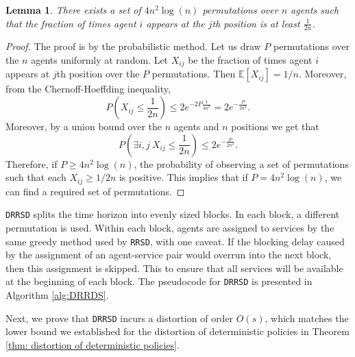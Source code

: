 \documentclass[letterpaper,11pt]{article}
\newtheorem{lemma}{Lemma}
\newcommand{\E}{\mathbb{E}}
\begin{document}
\begin{lemma}\label{lem:derandomization}
There exists a set of $4n^2 \log(n)$ permutations over $n$ agents such that the fraction of times agent $i$ appears at the $j$th position is at least $\frac{1}{2n}$.
\end{lemma}
\begin{proof}
    The proof is by the probabilistic method. Let us draw $P$ permutations over the $n$ agents uniformly at random. Let $X_{ij}$ be the fraction of times agent $i$ appears at $j$th position over the $P$ permutations. Then $\E[X_{ij}] = 1/n$. Moreover, from the Chernoff-Hoeffding inequality,
    $$
    P\left(X_{ij} \le \frac{1}{2n} \right) \le 2 e^{-2P\frac{1}{4n^2}} = 2 e^{-\frac{P}{2n^2}}.
    $$
    Moreover, by a union bound over the $n$ agents and $n$ positions we get that $$
    P\left(\exists i,j \ X_{ij} \le \frac{1}{2n} \right) \le 2 e^{-\frac{P}{2n^2}}.
    $$
    Therefore, if $P \ge 4n^2 \log(n)$, the probability of observing a set of permutations such that each $X_{ij} \ge 1/2n$ is positive. This implies that if $P = 4n^2 \log(n)$, we can find a required set of permutations.
\end{proof}
\texttt{DRRSD} splits the time horizon into evenly sized blocks. In each block, a different permutation is used. Within each block, agents are assigned to services by the same greedy method used by \texttt{RRSD}, with one caveat. If the blocking delay caused by the assignment of an agent-service pair would overrun into the next block, then this assignment is skipped. This to ensure that all services will be available at the beginning of each block. The pseudocode for \texttt{DRRSD} is presented in Algorithm \ref{alg:DRRDS}.

Next, we prove that \texttt{DRRSD} incurs a distortion of order $O(s)$, which matches the lower bound we established for the distortion of deterministic policies in Theorem \ref{thm: distortion of deterministic policies}.
\end{document}
